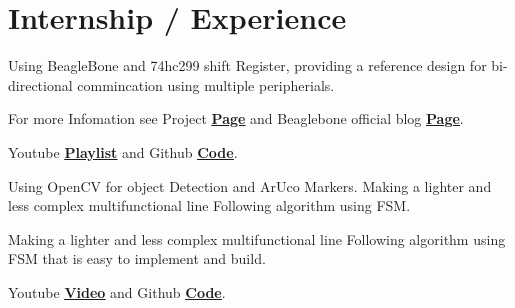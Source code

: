 \documentclass[]{font}
\begin{document}
\hfill
\begin{minipage}[t]{0.69\textwidth} 


\section{Internship / Experience}
\vspace{\topsep} %

\vspace{\topsep} %
\begin{tightemize}
\item Using BeagleBone and 74hc299 shift Register, providing a reference design for bi-directional commincation using multiple peripherials.
\item For more Infomation see Project \textbf{\href{https://elinux.org/Beagleboard_gsoc_2019_bi-directional_progress}{\underline{Page}}} and Beaglebone official blog \textbf{\href{https://beagleboard.org/blog/2019-06-02-beagleboard-org-community-kicks-off-gsoc-2019-with-four-projects}{\underline{Page}}}.
\item Youtube \textbf{\href{https://www.youtube.com/watch?v=ZZDT6jNslqw&list=PLttoix_9Us2yHM4zNr08ynm4iwXZTgxam}{\underline{Playlist}}} and Github \textbf{\href{https://github.com/pranav083/pocket_beagle-work}{\underline{Code}}}. 
\end{tightemize}
\sectionsep


\begin{tightemize}

\item Using OpenCV for object Detection and ArUco Markers. Making a lighter and less complex multifunctional line Following algorithm using FSM.
\item Making a lighter and less complex multifunctional line Following algorithm
using​ ​ FSM​ that is easy to implement and build.
\item Youtube \textbf{\href{https://youtu.be/FhUvQlrLWxc}{\underline{Video}}} and Github \textbf{\href{https://github.com/pranav083/FSM_code}{\underline{Code}}}. 
\end{tightemize}
\sectionsep



\end{minipage}
\end{document}

